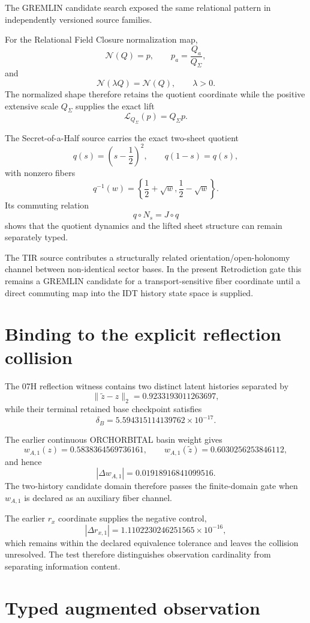 \documentclass[11pt]{book}
\begin{document}
The GREMLIN candidate search exposed the same relational pattern in independently versioned source families.

For the Relational Field Closure normalization map,
\[
\mathcal N(Q)=p,
\qquad
p_a=\frac{Q_a}{Q_\Sigma},
\]
and
\[
\mathcal N(\lambda Q)=\mathcal N(Q),
\qquad \lambda>0.
\]
The normalized shape therefore retains the quotient coordinate while the positive extensive scale $Q_\Sigma$ supplies the exact lift
\[
\mathcal L_{Q_\Sigma}(p)=Q_\Sigma p.
\]

The Secret-of-a-Half source carries the exact two-sheet quotient
\[
q(s)=\left(s-\frac12\right)^2,
\qquad
q(1-s)=q(s),
\]
with nonzero fibers
\[
q^{-1}(w)
=\left\{
\frac12+\sqrt w,
\frac12-\sqrt w
\right\}.
\]
Its commuting relation
\[
q\circ N_s=J\circ q
\]
shows that the quotient dynamics and the lifted sheet structure can remain separately typed.

The TIR source contributes a structurally related orientation/open-holonomy channel between non-identical sector bases.  In the present Retrodiction gate this remains a GREMLIN candidate for a transport-sensitive fiber coordinate until a direct commuting map into the IDT history state space is supplied.

\section{Binding to the explicit reflection collision}

The 07H reflection witness contains two distinct latent histories separated by
\[
\|\widetilde z-z\|_2
=0.9233193011263697,
\]
while their terminal retained base checkpoint satisfies
\[
\delta_B
=5.594315114139762\times10^{-17}.
\]

The earlier continuous ORCHORBITAL basin weight gives
\[
w_{A,1}(z)=0.5838364569736161,
\qquad
w_{A,1}(\widetilde z)=0.6030256253846112,
\]
and hence
\[
\boxed{
|\Delta w_{A,1}|=0.01918916841099516.
}
\]
The two-history candidate domain therefore passes the finite-domain gate when $w_{A,1}$ is declared as an auxiliary fiber channel.

The earlier $r_x$ coordinate supplies the negative control,
\[
|\Delta r_{x,1}|
=1.1102230246251565\times10^{-16},
\]
which remains within the declared equivalence tolerance and leaves the collision unresolved.  The test therefore distinguishes observation cardinality from separating information content.

\section{Typed augmented observation}
\end{document}
